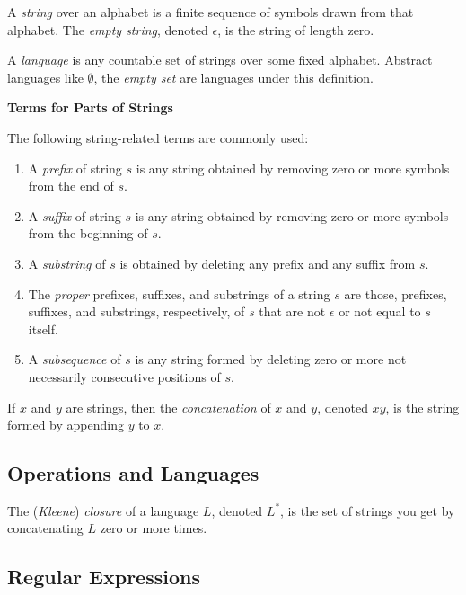 \documentclass[a4paper,twoside]{book}
\begin{document}
A \textit{string} over an alphabet is a finite sequence of symbols drawn from that alphabet. The \textit{empty string}, denoted $\epsilon$, is the string of length zero.

A \textit{language} is any countable set of strings over some fixed alphabet. Abstract languages like $\emptyset$, the \textit{empty set} are languages under this definition.

\begin{framed}
    \begin{center}
        \textbf{{\large Terms for Parts of Strings}}
    \end{center}

    The following string-related terms are commonly used:
    \begin{enumerate}
        \item A \textit{prefix} of string $s$ is any string obtained by removing zero or more symbols from the end of $s$.
        \item A \textit{suffix} of string $s$ is any string obtained by removing zero or more symbols from the beginning of $s$.
        \item A \textit{substring} of $s$ is obtained by deleting any prefix and any suffix from $s$.
        \item The \textit{proper} prefixes, suffixes, and substrings of a string $s$ are those, prefixes, suffixes, and substrings, respectively, of $s$ that are not $\epsilon$ or not equal to $s$ itself.
        \item A \textit{subsequence} of $s$ is any string formed by deleting zero or more not necessarily consecutive positions of $s$.
    \end{enumerate}
\end{framed}

If $x$ and $y$ are strings, then the \textit{concatenation} of $x$ and $y$, denoted $xy$, is the string formed by appending $y$ to $x$.

\subsection{Operations and Languages}

The (\textit{Kleene}) \textit{closure} of a language $L$, denoted $L^*$, is the set of strings you get by concatenating $L$ zero or more times.

\subsection{Regular Expressions}
\end{document}
